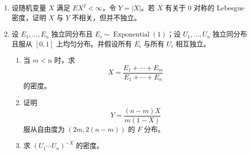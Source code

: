 \documentclass[UTF8,12pt]{ctexart}
\begin{document}
\begin{enumerate}[label=\textbf{\arabic*.},leftmargin=2.2em]
Wilcoxon 秩和检验：先把合并后的 \(X,Y\) 样本排序，再取 \(Y\) 样本对应秩之和。设 \(R_{y_1},\ldots,R_{y_n}\) 为 \(y_1<\cdots<y_n\) 在合并样本递增次序中的秩，定义
\[
W=\sum_{j=1}^n R_{y_j}.
\]

Mann--Whitney \(U\) 检验：令 \(U_{ij}=1\) 当且仅当 \(X_i<Y_j\)，否则 \(U_{ij}=0\)，并定义
\[
U=\sum_{i=1}^m\sum_{j=1}^n U_{ij}.
\]
概率 \(\gamma=P(X<Y)\) 可由 \(U/(mn)\) 估计，判别规则基于检验 \(\gamma=0.5\)。假设样本值没有并列。
\begin{enumerate}[label=\textbf{(\alph*)},leftmargin=2.4em]
\item 证明
\[
W=U+\frac12n(n+1),
\]
从而两个统计量只差常数，并给出完全相同的 \(p\)-值。
\item 利用中心极限定理，Wilcoxon 秩和统计量 \(W\) 可标准化为
\[
Z_W=\frac{W-\mu_W}{\sigma_W}.
\]
其中 \(\mu_W,\sigma_W^2\) 是 \(H_0\) 下 \(W\) 的均值与方差。证明
\[
\mu_W=\frac12n(N+1),\qquad \sigma_W^2=\frac1{12}mn(N+1).
\]
\end{enumerate}

\item 设随机变量 \(X\) 满足 \(E X^2<\infty\)，令 \(Y=|X|\)。若 \(X\) 有关于 \(0\) 对称的 Lebesgue 密度，证明 \(X\) 与 \(Y\) 不相关，但并不独立。

\item 设 \(E_1,\ldots,E_n\) 独立同分布且 \(E_i\sim\operatorname{Exponential}(1)\)；设 \(U_1,\ldots,U_n\) 独立同分布且服从 \([0,1]\) 上均匀分布。并假设所有 \(E_i\) 与所有 \(U_i\) 相互独立。
\begin{enumerate}[label=\textbf{(\alph*)},leftmargin=2.4em]
\item 当 \(m<n\) 时，求
\[
X=\frac{E_1+\cdots+E_m}{E_1+\cdots+E_n}
\]
的密度。
\item 证明
\[
Y=\frac{(n-m)X}{m(1-X)}
\]
服从自由度为 \((2m,2(n-m))\) 的 \(F\) 分布。
\item 求 \((U_1\cdots U_n)^{-X}\) 的密度。
\end{enumerate}
\end{enumerate}
\end{document}
